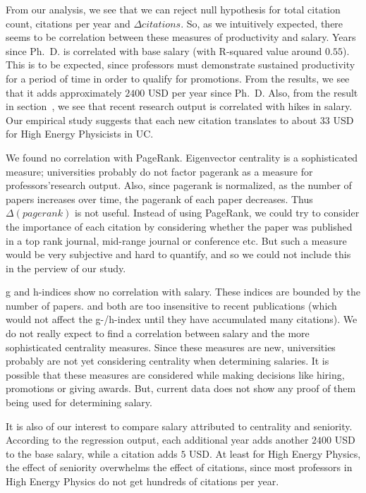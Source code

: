 From our analysis, we see that we can reject null hypothesis for total citation count, citations per year and $\Delta citations$. So, as we intuitively expected, there seems to be correlation between these measures of productivity and salary. Years since Ph.~D. is correlated with base salary (with R-squared value around $0.55$). This is to be expected, since professors must demonstrate sustained productivity for a period of time in order to qualify for promotions. From the results, we see that it adds approximately $2400$ USD per year since Ph.~D. Also, from the result in section~, we see that recent research output is correlated with hikes in salary. Our empirical study suggests that each new citation translates to about $33$ USD for High Energy Physicists in UC. 

We found no correlation with PageRank. Eigenvector centrality is a sophisticated measure; universities probably do not factor pagerank as a measure for professors\textquoteright  research output. Also, since pagerank is normalized, as the number of papers increases over time, the pagerank of each paper decreases. Thus $\Delta(pagerank)$ is not useful. Instead of using PageRank, we could try to consider the importance of each citation by considering whether the paper was published in a top rank journal, mid-range journal or conference etc. But such a measure would be very subjective and hard to quantify, and so we could not include this in the perview of our study.

g and h-indices show no correlation with salary.  These indices are bounded by the number of papers. and both are too insensitive to recent publications (which would not affect the g-/h-index until they have accumulated many citations). We do not really expect to find a correlation between salary and the more sophisticated centrality measures. Since these measures are new, universities probably are not yet considering centrality when determining salaries. It is possible that these measures are considered while making decisions like hiring, promotions or giving awards. But, current data does not show any proof of them being used for determining salary.

It is also of our interest to compare salary attributed to centrality and seniority. According to the regression output, each additional year adds another $2400$ USD to the base salary, while a citation adds $5$ USD. At least for High Energy Physics, the effect of seniority overwhelms the effect of citations, since most professors in High Energy Physics do not get hundreds of citations per year.
